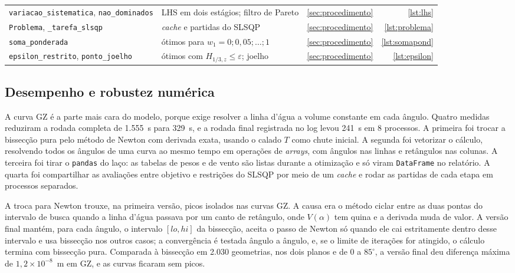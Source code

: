 \documentclass[11pt,a4paper]{article}
\newcommand{\Hz}{H_{1/3,z}}
\begin{document}
\begin{table}[!htb]
\begin{tabular}{>{\raggedright\arraybackslash}p{4.4cm}>{\raggedright\arraybackslash}p{6.9cm}rr}
\texttt{variacao\_sistematica}, \texttt{nao\_dominados} & LHS em dois estágios; filtro de Pareto &
\ref{sec:procedimento} & \ref{lst:lhs} \\
\texttt{Problema}, \texttt{\_tarefa\_slsqp} & \emph{cache} e partidas do SLSQP & \ref{sec:procedimento}
& \ref{lst:problema} \\
\texttt{soma\_ponderada} & ótimos para $w_1 = 0; 0{,}05; \ldots; 1$ & \ref{sec:procedimento} &
\ref{lst:somapond} \\
\texttt{epsilon\_restrito}, \texttt{ponto\_joelho} & ótimos com $\Hz \le \varepsilon$; joelho &
\ref{sec:procedimento} & \ref{lst:epsilon} \\
\bottomrule
\end{tabular}
\end{table}

\subsection{Desempenho e robustez numérica}\label{sec:cod-desempenho}

A curva GZ é a parte mais cara do modelo, porque exige resolver a linha d'água a volume constante
em cada ângulo. Quatro medidas reduziram a rodada completa de 1.555~s para 329~s, e a rodada final
registrada no log levou 241~s em 8 processos. A primeira foi trocar a bissecção pura pelo método de
Newton com derivada exata, usando o calado $T$ como chute inicial. A segunda foi vetorizar o
cálculo, resolvendo todos os ângulos de uma curva ao mesmo tempo em operações de \emph{arrays}, com
ângulos nas linhas e retângulos nas colunas. A terceira foi tirar o \texttt{pandas} do laço: as
tabelas de pesos e de vento são listas durante a otimização e só viram \texttt{DataFrame} no
relatório. A quarta foi compartilhar as avaliações entre objetivo e restrições do SLSQP por meio de
um \emph{cache} e rodar as partidas de cada etapa em processos separados.

A troca para Newton trouxe, na primeira versão, picos isolados nas curvas GZ. A causa era o método
ciclar entre as duas pontas do intervalo de busca quando a linha d'água passava por um canto de
retângulo, onde $V(\alpha)$ tem quina e a derivada muda de valor. A versão final mantém, para cada
ângulo, o intervalo $[lo, hi]$ da bissecção, aceita o passo de Newton só quando ele cai estritamente
dentro desse intervalo e usa bissecção nos outros casos; a convergência é testada ângulo a ângulo,
e, se o limite de iterações for atingido, o cálculo termina com bissecção pura. Comparada à
bissecção em 2.030 geometrias, nos dois planos e de 0 a $85^\circ$, a versão final deu diferença
máxima de $1{,}2\times10^{-8}$~m em GZ, e as curvas ficaram sem picos.
\end{document}
